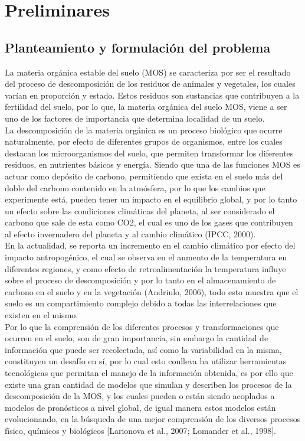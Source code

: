 \chapter{Preliminares}

\section{Planteamiento y formulaci\'on del problema}
La materia orgánica estable del suelo (MOS) se caracteriza por ser el resultado del proceso de descomposición de los residuos de animales y vegetales, los cuales varían en proporción y estado. Estos residuos son sustancias que contribuyen a la fertilidad del suelo, por lo que,  la materia org\'anica del suelo MOS, viene a ser uno de los factores de importancia que determina localidad de un suelo.\\

La descomposición de la materia orgánica es un proceso biológico que ocurre naturalmente, por efecto de diferentes grupos de organismos, entre los cuales destacan los microorganismos del suelo, que permiten transformar los diferentes residuos, en nutrientes básicos y energía. Siendo que una de las funciones MOS es actuar como depósito de carbono, permitiendo que exista en el suelo más del doble del carbono contenido en la atmósfera, por lo que los cambios que experimente está, pueden tener un impacto en el equilibrio global, y por lo tanto un efecto sobre las condiciones climáticas del planeta, al ser considerado el carbono que sale de esta como CO2, el cual es uno de los gases que contribuyen al efecto invernadero del planeta y al cambio climático (IPCC, 2000).\\

En la actualidad, se reporta un incremento en el cambio climático por efecto del impacto antropogénico, el cual se observa en el aumento de la temperatura en diferentes regiones, y como efecto de retroalimentación la temperatura influye sobre el proceso de descomposición y por lo tanto en el almacenamiento de carbono en el suelo y en la vegetación (Andriulo, 2006), todo esto muestra que el suelo es un compartimiento complejo debido a todas las interrelaciones que existen en el mismo.\\

Por lo que la comprensión de los diferentes procesos y transformaciones que ocurren en el suelo, son de gran importancia, sin embargo la cantidad de información que puede ser recolectada, así como la variabilidad en la misma, constituyen un desafío en sí, por lo cual esto conlleva ha utilizar herramientas tecnológicas que permitan el manejo de la información obtenida, es por ello que existe una gran cantidad de modelos que simulan y describen los procesos de la descomposición de la MOS, y los cuales pueden o están siendo acoplados a modelos de pronósticos a nivel global, de igual manera estos modelos están evolucionando, en la búsqueda de una mejor comprensión de los diversos procesos físico, químicos y biológicos [Larionova et al., 2007; Lomander et al., 1998].\\

